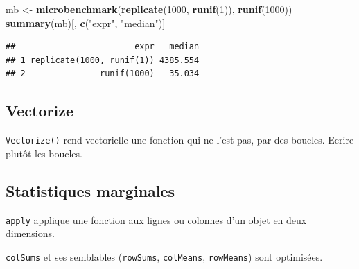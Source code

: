 \documentclass[
  12pt,
  french,
  a4paper,
  extrafontsizes,onecolumn,openright
  ]{memoir}
\newenvironment{Shaded}{\begin{snugshade}}{\end{snugshade}}
\newcommand{\DecValTok}[1]{\textcolor[rgb]{0.00,0.00,0.81}{#1}}
\newcommand{\KeywordTok}[1]{\textcolor[rgb]{0.13,0.29,0.53}{\textbf{#1}}}
\newcommand{\NormalTok}[1]{#1}
\newcommand{\StringTok}[1]{\textcolor[rgb]{0.31,0.60,0.02}{#1}}
\begin{document}
\scriptsize

\begin{Shaded}
\begin{Highlighting}[]
\NormalTok{mb <-}\StringTok{ }\KeywordTok{microbenchmark}\NormalTok{(}\KeywordTok{replicate}\NormalTok{(}\DecValTok{1000}\NormalTok{, }\KeywordTok{runif}\NormalTok{(}\DecValTok{1}\NormalTok{)), }\KeywordTok{runif}\NormalTok{(}\DecValTok{1000}\NormalTok{))}
\KeywordTok{summary}\NormalTok{(mb)[, }\KeywordTok{c}\NormalTok{(}\StringTok{"expr"}\NormalTok{, }\StringTok{"median"}\NormalTok{)]}
\end{Highlighting}
\end{Shaded}

\begin{verbatim}
##                        expr   median
## 1 replicate(1000, runif(1)) 4385.554
## 2               runif(1000)   35.034
\end{verbatim}

\normalsize

\hypertarget{vectorize}{%
\subsection{Vectorize}\label{vectorize}}

\texttt{Vectorize()} rend vectorielle une fonction qui ne l'est pas, par des boucles.
Ecrire plutôt les boucles.

\hypertarget{statistiques-marginales}{%
\subsection{Statistiques marginales}\label{statistiques-marginales}}

\texttt{apply} applique une fonction aux lignes ou colonnes d'un objet en deux dimensions.

\texttt{colSums} et ses semblables (\texttt{rowSums}, \texttt{colMeans}, \texttt{rowMeans}) sont optimisées.

\scriptsize
\end{document}
